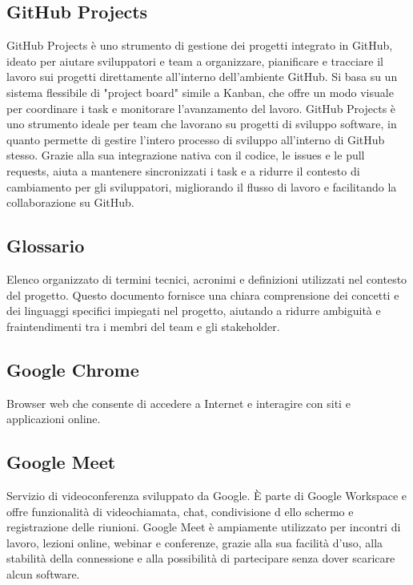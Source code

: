 \subsection*{GitHub Projects}
GitHub Projects è uno strumento di gestione dei progetti integrato in GitHub, ideato per aiutare sviluppatori e team a organizzare, pianificare e tracciare 
il lavoro sui progetti direttamente all'interno dell'ambiente GitHub. Si basa su un sistema flessibile di "project board" simile a Kanban, che offre un modo 
visuale per coordinare i task e monitorare l’avanzamento del lavoro. GitHub Projects è uno strumento ideale per team che lavorano su progetti di sviluppo 
software, in quanto permette di gestire l’intero processo di sviluppo all'interno di GitHub stesso. Grazie alla sua integrazione nativa con il codice, le 
issues e le pull requests, aiuta a mantenere sincronizzati i task e a ridurre il contesto di cambiamento per gli sviluppatori, migliorando il flusso di 
lavoro e facilitando la collaborazione su GitHub.

\subsection*{Glossario}
Elenco organizzato di termini tecnici, acronimi e definizioni utilizzati nel contesto del progetto. Questo documento fornisce una chiara comprensione dei 
concetti e dei linguaggi specifici impiegati nel progetto, aiutando a ridurre ambiguità e fraintendimenti tra i membri del team e gli stakeholder.

\hypertarget{sec:google_chrome}{}
\subsection*{Google Chrome}
Browser web che consente di accedere a Internet e interagire con siti e applicazioni online.


\hypertarget{sec:google_meet}{}
\subsection*{Google Meet}
Servizio di videoconferenza sviluppato da Google. È parte di Google Workspace e offre funzionalità di videochiamata, chat, condivisione d
ello schermo e registrazione delle riunioni. Google Meet è ampiamente utilizzato per incontri di lavoro, lezioni online, webinar e conferenze, 
grazie alla sua facilità d’uso, alla stabilità della connessione e alla possibilità di partecipare senza dover scaricare alcun software.

